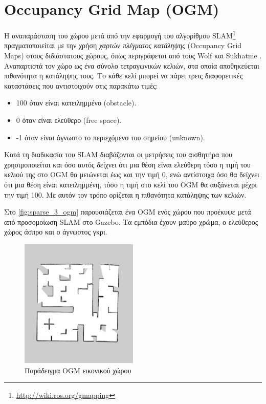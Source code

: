\section{Occupancy Grid Map (OGM)}
\label{section:ogm}

Η αναπαράσταση του χώρου μετά από την εφαρμογή του αλγορίθμου SLAM\footnote{\href{http://wiki.ros.org/gmapping}{http://wiki.ros.org/gmapping}} πραγματοποιείται με την χρήση \emph{χαρτών πλέγματος κατάληψης} (Occupancy Grid Maps) στους διδιάστατους χώρους, όπως περιγράφεται από τους Wolf και Sukhatme \cite{ogm2005}. Αναπαρτιστά τον χώρο ως ένα σύνολο τετραγωνικών κελιών, στα οποία αποθηκεύεται πιθανότητα η κατάληψης τους. Το κάθε κελί μπορεί να πάρει τρεις διαφορετικές καταστάσεις που αντιστοιχούν στις παρακάτω τιμές:
\begin{itemize}
    \setlength\itemsep{-0.2em}
    \item 100 όταν είναι κατειλημμένο (obstacle).
    \item 0 όταν είναι ελεύθερο (free space).
    \item -1 όταν είναι άγνωστο το περιεχόμενο του σημείου (unknown).
\end{itemize}
Κατά τη διαδικασία του SLAM διαβάζονται οι μετρήσεις του αισθητήρα που χρησιμοποιείται και όσο αυτός δείχνει ότι μια θέση είναι ελεύθερη τόσο η τιμή του κελιού της στο OGM θα μειώνεται έως και την τιμή 0, ενώ αντίστοιχα όσο θα δείχνει ότι μια θέση είναι κατειλημμένη, τόσο η τιμή στο κελί του OGM θα αυξάνεται μέχρι την τιμή 100. Με αυτόν τον τρόπο ορίζεται η πιθανότητα κατάληψης των κελιών.

Στο \autoref{fig:sparse_3_ogm} παρουσιάζεται ένα OGM ενός χώρου που προέκυψε μετά από προσομοίωση SLAM στο Gazebo. Τα εμπόδια έχουν μαύρο χρώμα, ο ελεύθερος χώρος άσπρο και ο άγνωστος γκρι.
\begin{figure}
    \centering
    \includegraphics[width=0.5\textwidth]{./images/chapter3/sparse_3.png}
    \caption{Παράδειγμα ΟGM εικονικού χώρου}
    \label{fig:sparse_3_ogm}
\end{figure}
